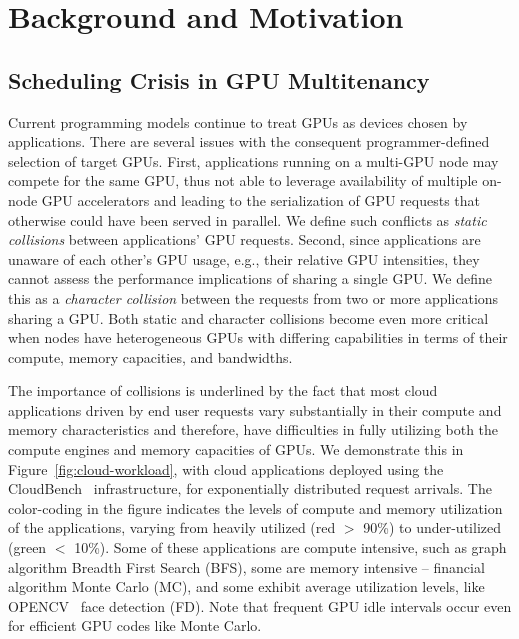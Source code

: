 \section{Background and Motivation}
\subsection{Scheduling Crisis in GPU Multitenancy}
Current programming models continue to treat GPUs as devices chosen by applications. There are several issues with the consequent programmer-defined selection of target GPUs. First, applications running on a multi-GPU node may compete for the same GPU, thus not able to leverage availability of multiple on-node GPU accelerators and leading to the serialization of GPU requests that  otherwise  could  have  been served in parallel. We define such conflicts as \textit{static collisions} between applications' GPU requests. Second, since applications are unaware of each other’s GPU usage, e.g., their relative GPU intensities, they cannot assess the performance implications of sharing a single GPU. We define this as a \textit{character collision} between the requests from two or more applications sharing a GPU. Both static and character collisions become even more critical when nodes have heterogeneous GPUs with differing capabilities in terms of their compute, memory capacities, and bandwidths. 
	
	The importance of collisions is underlined by the fact that most cloud applications driven by end user requests vary substantially in their compute and memory characteristics and therefore, have difficulties in fully utilizing both the compute engines and memory capacities of GPUs. We demonstrate this in Figure~\ref{fig:cloud-workload}, with cloud applications deployed using the CloudBench~\cite{cloudbench} infrastructure, for exponentially distributed request arrivals. The color-coding in the figure indicates the levels of compute and memory utilization of the applications, varying from heavily utilized (red $>$ 90\%) to under-utilized (green $<$ 10\%). Some of these applications are compute intensive, such as graph algorithm Breadth First Search (BFS), some are memory intensive – financial algorithm Monte Carlo (MC), and some exhibit average utilization levels, like OPENCV~\cite{opencv} face detection (FD). Note that frequent GPU idle intervals occur even for efficient GPU codes like Monte Carlo.
	

